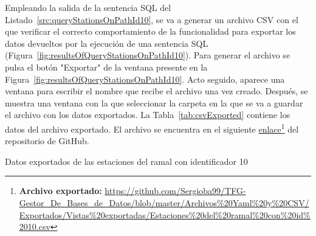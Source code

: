 Empleando la salida de la sentencia \acrshort{SQL} del Listado~\ref{src:queryStationsOnPathId10}, se va a generar un archivo \acrshort{CSV} con el que verificar el correcto comportamiento de la funcionalidad para exportar los datos devueltos por la ejecución de una sentencia \acrshort{SQL} (Figura~\ref{fig:resultsOfQueryStationsOnPathId10}). Para generar el archivo se pulsa el botón "Exportar" de la ventana presente en la Figura~\ref{fig:resultsOfQueryStationsOnPathId10}. Acto seguido, aparece una ventana para escribir el nombre que recibe el archivo una vez creado. Después, se muestra una ventana con la que seleccionar la carpeta en la que se va a guardar el archivo con los datos exportados. La Tabla~\ref{tab:csvExported} contiene los datos del archivo exportado. El archivo se encuentra en el siguiente \href{https://github.com/Sergioba99/TFG-Gestor_De_Bases_de_Datos/blob/master/Archivos%20Yaml%20y%20CSV/Exportados/Vistas%20exportadas/Estaciones%20del%20ramal%20con%20id%2010.csv}{enlace}\footnote{\textbf{Archivo exportado: }\url{https://github.com/Sergioba99/TFG-Gestor\_De\_Bases\_de\_Datos/blob/master/Archivos\%20Yaml\%20y\%20CSV/Exportados/Vistas\%20exportadas/Estaciones\%20del\%20ramal\%20con\%20id\%2010.csv}} del repositorio de GitHub.


\begin{table}[ht]
    \centering
    \caption{Datos exportados de las estaciones del ramal con identificador 10}
    \label{tab:csvExported}
\end{table}
